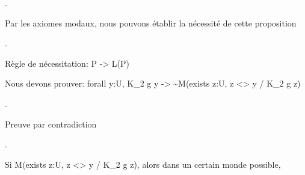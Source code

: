 \documentclass[10pt]{report}
\begin{document}
\begin{coqdoccode}
 .\coqdoceol
\coqdocemptyline
\coqdocindent{1.00em}
\begin{coqdoccomment}
\coqdocindent{0.50em}
Par\coqdocindent{0.50em}
les\coqdocindent{0.50em}
axiomes\coqdocindent{0.50em}
modaux,\coqdocindent{0.50em}
nous\coqdocindent{0.50em}
pouvons\coqdocindent{0.50em}
établir\coqdocindent{0.50em}
la\coqdocindent{0.50em}
nécessité\coqdocindent{0.50em}
de\coqdocindent{0.50em}
cette\coqdocindent{0.50em}
proposition\coqdocindent{0.50em}
\end{coqdoccomment}
\coqdoceol
\coqdocindent{1.00em}
 . \begin{coqdoccomment}
\coqdocindent{0.50em}
Règle\coqdocindent{0.50em}
de\coqdocindent{0.50em}
nécessitation:\coqdocindent{0.50em}
P\coqdocindent{0.50em}
->\coqdocindent{0.50em}
L(P)\coqdocindent{0.50em}
\end{coqdoccomment}
\coqdoceol
\coqdocemptyline
\coqdocindent{1.00em}
\begin{coqdoccomment}
\coqdocindent{0.50em}
Nous\coqdocindent{0.50em}
devons\coqdocindent{0.50em}
prouver:\coqdocindent{0.50em}
forall\coqdocindent{0.50em}
y:U,\coqdocindent{0.50em}
K\_2\coqdocindent{0.50em}
g\coqdocindent{0.50em}
y\coqdocindent{0.50em}
->\coqdocindent{0.50em}
\~{}M(exists\coqdocindent{0.50em}
z:U,\coqdocindent{0.50em}
z\coqdocindent{0.50em}
<>\coqdocindent{0.50em}
y\coqdocindent{0.50em}
/\coqdocindent{0.50em}
K\_2\coqdocindent{0.50em}
g\coqdocindent{0.50em}
z)\coqdocindent{0.50em}
\end{coqdoccomment}
\coqdoceol
\coqdocindent{1.00em}
  .\coqdoceol
\coqdocemptyline
\coqdocindent{1.00em}
\begin{coqdoccomment}
\coqdocindent{0.50em}
Preuve\coqdocindent{0.50em}
par\coqdocindent{0.50em}
contradiction\coqdocindent{0.50em}
\end{coqdoccomment}
\coqdoceol
\coqdocindent{1.00em}
 .\coqdoceol
\coqdocemptyline
\coqdocindent{1.00em}
\begin{coqdoccomment}
\coqdocindent{0.50em}
Si\coqdocindent{0.50em}
M(exists\coqdocindent{0.50em}
z:U,\coqdocindent{0.50em}
z\coqdocindent{0.50em}
<>\coqdocindent{0.50em}
y\coqdocindent{0.50em}
/\coqdocindent{0.50em}
K\_2\coqdocindent{0.50em}
g\coqdocindent{0.50em}
z),\coqdocindent{0.50em}
alors\coqdocindent{0.50em}
dans\coqdocindent{0.50em}
un\coqdocindent{0.50em}
certain\coqdocindent{0.50em}
monde\coqdocindent{0.50em}
possible,\coqdoceol
\coqdocindent{2.50em}

\end{coqdoccomment}
\end{coqdoccode}
\end{document}
